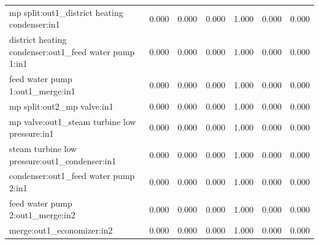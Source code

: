 \documentclass[]{article}
\begin{document}
\begin{table}[H]
\begin{tabular}{lrrrrrr}
mp split:out1\_district heating condenser:in1                  &                       0.000 &                         0.000 &                         0.000 &                         1.000 &                       0.000 &                       0.000 \\
district heating condenser:out1\_feed water pump 1:in1         &                       0.000 &                         0.000 &                         0.000 &                         1.000 &                       0.000 &                       0.000 \\
feed water pump 1:out1\_merge:in1                              &                       0.000 &                         0.000 &                         0.000 &                         1.000 &                       0.000 &                       0.000 \\
mp split:out2\_mp valve:in1                                    &                       0.000 &                         0.000 &                         0.000 &                         1.000 &                       0.000 &                       0.000 \\
mp valve:out1\_steam turbine low pressure:in1                  &                       0.000 &                         0.000 &                         0.000 &                         1.000 &                       0.000 &                       0.000 \\
steam turbine low pressure:out1\_condenser:in1                 &                       0.000 &                         0.000 &                         0.000 &                         1.000 &                       0.000 &                       0.000 \\
condenser:out1\_feed water pump 2:in1                          &                       0.000 &                         0.000 &                         0.000 &                         1.000 &                       0.000 &                       0.000 \\
feed water pump 2:out1\_merge:in2                              &                       0.000 &                         0.000 &                         0.000 &                         1.000 &                       0.000 &                       0.000 \\
merge:out1\_economizer:in2                                     &                       0.000 &                         0.000 &                         0.000 &                         1.000 &                       0.000 &                       0.000 \\

\end{tabular}
\end{table}
\end{document}
